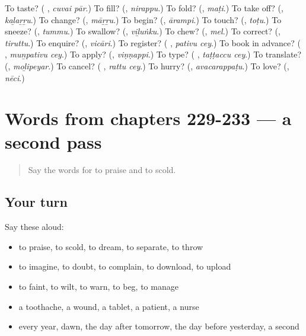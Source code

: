 \begin{tcolorbox}[breakable,colback=teal!4,colframe=teal!35!black,title={Before you move on}]
To taste? (\textbf{ }, \emph{cuvai pār}.) To fill? (\textbf{}, \emph{nirappu}.) To fold? (\textbf{}, \emph{maṭi}.) To take off? (\textbf{}, \emph{kaḻaṟṟu}.) To change? (\textbf{}, \emph{māṟṟu}.) To begin? (\textbf{}, \emph{ārampi}.) To touch? (\textbf{}, \emph{toṭu}.) To sneeze? (\textbf{}, \emph{tummu}.) To swallow? (\textbf{}, \emph{viḻuṅku}.) To chew? (\textbf{}, \emph{mel}.) To correct? (\textbf{}, \emph{tiruttu}.) To enquire? (\textbf{}, \emph{vicāri}.) To register? (\textbf{ }, \emph{pativu cey}.) To book in advance? (\textbf{ }, \emph{muṉpativu cey}.) To apply? (\textbf{}, \emph{viṇṇappi}.) To type? (\textbf{ }, \emph{taṭṭaccu cey}.) To translate? (\textbf{}, \emph{moḻipeyar}.) To cancel? (\textbf{ }, \emph{rattu cey}.) To hurry? (\textbf{}, \emph{avacarappaṭu}.) To love? (\textbf{}, \emph{nēci}.)
\end{tcolorbox}
\section[(dialogue)]{Words from chapters 229-233 — a second pass}

\label{lesson:TA-R233-second-pass-words-from-chapters-229-233}



\begin{quote}
Say the words for to praise and to scold.
\end{quote}

\subsection*{Your turn}
Say these aloud:

\begin{itemize}
\raggedright
  \item to praise, to scold, to dream, to separate, to throw
  \item to imagine, to doubt, to complain, to download, to upload
  \item to faint, to wilt, to warn, to beg, to manage
  \item a toothache, a wound, a tablet, a patient, a nurse
  \item every year, dawn, the day after tomorrow, the day before yesterday, a second
\end{itemize}


